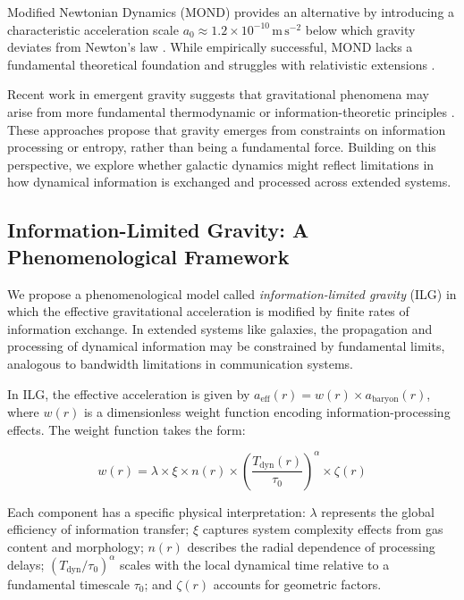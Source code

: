 \documentclass[12pt,a4paper]{article}
\begin{document}
Modified Newtonian Dynamics (MOND) provides an alternative by introducing a characteristic acceleration scale $a_0 \approx 1.2 \times 10^{-10}\,\mathrm{m\,s^{-2}}$ below which gravity deviates from Newton's law \citep{milgrom1983}. While empirically successful, MOND lacks a fundamental theoretical foundation and struggles with relativistic extensions \citep{famaey2012}.

Recent work in emergent gravity suggests that gravitational phenomena may arise from more fundamental thermodynamic or information-theoretic principles \citep{verlinde2011, verlinde2017}. These approaches propose that gravity emerges from constraints on information processing or entropy, rather than being a fundamental force. Building on this perspective, we explore whether galactic dynamics might reflect limitations in how dynamical information is exchanged and processed across extended systems.

\subsection{Information-Limited Gravity: A Phenomenological Framework}

We propose a phenomenological model called \emph{information-limited gravity} (ILG) in which the effective gravitational acceleration is modified by finite rates of information exchange. In extended systems like galaxies, the propagation and processing of dynamical information may be constrained by fundamental limits, analogous to bandwidth limitations in communication systems.

In ILG, the effective acceleration is given by $a_\mathrm{eff}(r) = w(r) \times a_\mathrm{baryon}(r)$, where $w(r)$ is a dimensionless weight function encoding information-processing effects. The weight function takes the form:

\begin{equation}
w(r) = \lambda \times \xi \times n(r) \times \left(\frac{T_\mathrm{dyn}(r)}{\tau_0}\right)^\alpha \times \zeta(r)
\end{equation}

Each component has a specific physical interpretation: $\lambda$ represents the global efficiency of information transfer; $\xi$ captures system complexity effects from gas content and morphology; $n(r)$ describes the radial dependence of processing delays; $(T_\mathrm{dyn}/\tau_0)^\alpha$ scales with the local dynamical time relative to a fundamental timescale $\tau_0$; and $\zeta(r)$ accounts for geometric factors.
\end{document}
